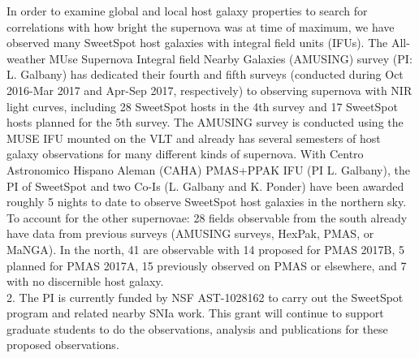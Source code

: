 \documentclass[11pt]{article}
\begin{document}
In order to examine global and local host galaxy properties to search for correlations with how bright the supernova was at time of maximum, we have observed many SweetSpot host galaxies with integral field units (IFUs).
The All-weather MUse Supernova Integral field Nearby Galaxies (AMUSING) survey (PI: L. Galbany) has dedicated their fourth and fifth surveys (conducted during Oct 2016-Mar 2017 and Apr-Sep 2017, respectively) to observing supernova with NIR light curves, including 28 SweetSpot hosts in the 4th survey and 17 SweetSpot hosts planned for the 5th survey.
The AMUSING survey is conducted using the MUSE IFU mounted on the VLT and already has several semesters of host galaxy observations for many different kinds of supernova. 
With Centro Astronomico Hispano Aleman (CAHA) PMAS+PPAK IFU (PI L. Galbany), the PI of SweetSpot and two Co-Is (L. Galbany and K. Ponder) have been awarded roughly 5 nights to date to observe SweetSpot host galaxies in the northern sky.
To account for the other supernovae: 28 fields observable from the south already have data from previous surveys (AMUSING surveys, HexPak, PMAS, or MaNGA). 
In the north, 41 are observable with 14 proposed for PMAS 2017B, 5 planned for PMAS 2017A, 15 previously observed on PMAS or elsewhere, and 7 with no discernible host galaxy.
\\

2. The PI is currently funded by NSF AST-1028162 to carry out the SweetSpot program and related nearby SNIa work.  This grant will continue to support graduate students to do the observations, analysis and publications for these proposed observations.

%
%
%
%
%


%
\end{document}

